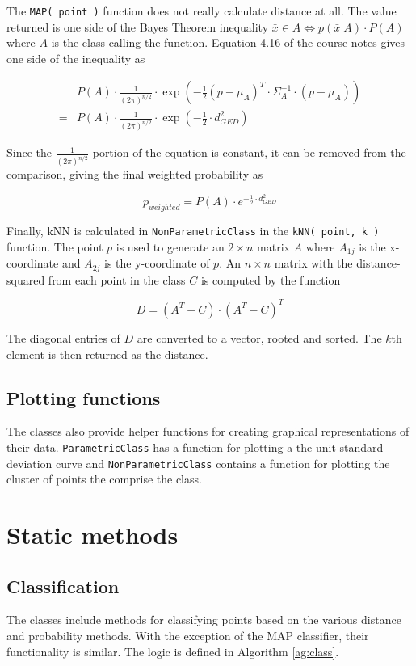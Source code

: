 The {\tt MAP( point )} function does not really calculate distance at all. The
value returned is one side of the Bayes Theorem inequality $\bar x \in A \iff p(\bar
x|A) \cdot P(A)$ where $A$ is the class calling the function. Equation 4.16 of
the course notes gives one side of the inequality as

\begin{align*}
&P(A) \cdot \frac{1}{(2
\pi)^{n/2}} \cdot \exp(-\frac{1}{2}(p - \mu_A)^T \cdot \Sigma_A^{-1} \cdot (p
- \mu_A)) \\
= &P(A) \cdot \frac{1}{(2 \pi)^{n/2}} \cdot \exp(-\frac{1}{2} \cdot d_{GED}^2)
\end{align*}

Since the $\frac{1}{(2 \pi)^{n/2}}$ portion of the equation is constant, it can
be removed from the comparison, giving the final weighted probability as

\begin{equation}
p_{weighted} = P(A) \cdot e^{-\frac{1}{2} \cdot d_{GED}^2}
\end{equation}

Finally, kNN is calculated in {\tt NonParametricClass} in the {\tt kNN( point,
k )} function. The point $p$ is used to generate an $2 \times n$ matrix
$A$ where $A_{1j}$ is the x-coordinate and $A_{2j}$ is the y-coordinate of $p$.
An $n \times n$ matrix with the distance-squared from each point in the class
$C$ is computed by the function

$$
D = (A^T-C) \cdot (A^T - C)^T
$$

The diagonal entries of $D$ are converted to a vector, rooted and sorted. The
$k$th element is then returned as the distance.

\subsection{Plotting functions}
The classes also provide helper functions for creating graphical
representations of their data. {\tt ParametricClass} has a function for
plotting a the unit standard deviation curve and {\tt NonParametricClass}
contains a function for plotting the cluster of points the comprise the class.

\section{Static methods}
\subsection{Classification}
The classes include methods for classifying points based on the various
distance and probability methods. With the exception of the MAP classifier,
their functionality is similar. The logic is defined in Algorithm
\ref{ag:class}.

